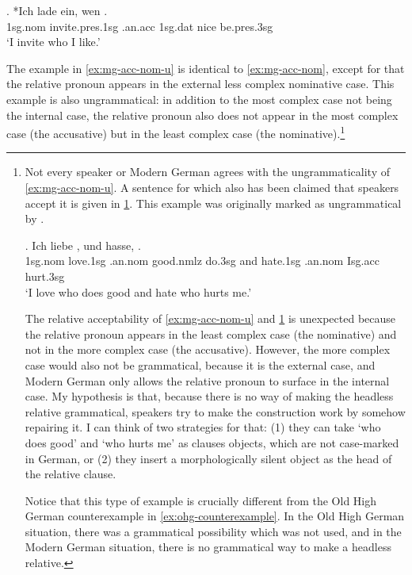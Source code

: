 \exg. *Ich {lade ein}, wen   .\\
1\ac{sg}.\ac{nom} invite.\ac{pres}.1\ac{sg}\scsub{[acc]} .\ac{an}.\ac{acc} 1\ac{sg}.\ac{dat} nice be.\ac{pres}.3\ac{sg}\scsub{[nom]}\\
`I invite who I like.' \label{ex:mg-acc-nom}

The example in \ref{ex:mg-acc-nom-u} is identical to \ref{ex:mg-acc-nom}, except for that the relative pronoun appears in the external less complex nominative case. This example is also ungrammatical: in addition to the most complex case not being the internal case, the relative pronoun also does not appear in the most complex case (the accusative) but in the least complex case (the nominative).\footnote{
Not every speaker or Modern German agrees with the ungrammaticality of \ref{ex:mg-acc-nom-u}. A sentence for which also has been claimed that speakers accept it is given in \ref{ex:mg-liebe-hasse}. This example was originally marked as ungrammatical by .

\exg. Ich liebe   , und hasse,   .\\
1\ac{sg}.\ac{nom} love.1\ac{sg}\scsub{[acc]} .\ac{an}.\ac{nom} good.\ac{nmlz} do.3\ac{sg}\scsub{[nom]}
and hate.1\ac{sg}\scsub{[acc]} .\ac{an}.\ac{nom} I\ac{sg}.\ac{acc} hurt.3\ac{sg}\scsub{[nom]}\\
`I love who does good and hate who hurts me.' \label{ex:mg-liebe-hasse}

The relative acceptability of \ref{ex:mg-acc-nom-u} and \ref{ex:mg-liebe-hasse} is unexpected because the relative pronoun appears in the least complex case (the nominative) and not in the more complex case (the accusative). However, the more complex case would also not be grammatical, because it is the external case, and Modern German only allows the relative pronoun to surface in the internal case. My hypothesis is that, because there is no way of making the headless relative grammatical, speakers try to make the construction work by somehow repairing it. I can think of two strategies for that: (1) they can take  `who does good' and  `who hurts me' as clauses objects, which are not case-marked in German, or (2) they insert a morphologically silent object as the head of the relative clause.

Notice that this type of example is crucially different from the Old High German counterexample in \ref{ex:ohg-counterexample}. In the Old High German situation, there was a grammatical possibility which was not used, and in the Modern German situation, there is no grammatical way to make a headless relative.
}

